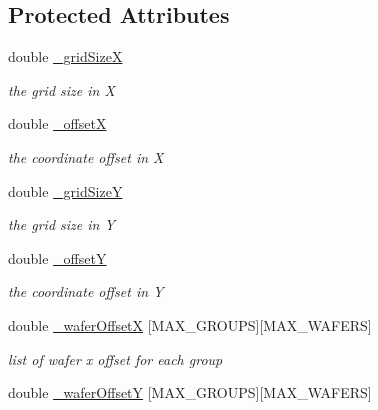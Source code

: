 \subsection*{Protected Attributes}
\begin{DoxyCompactItemize}
\item 
double \hyperlink{class_d_d4hep_1_1_d_d_segmentation_1_1_wafer_grid_x_y_af1d00f186fda3aca2aed961911bc3c04}{\_\-gridSizeX}
\begin{DoxyCompactList}\small\item\em the grid size in X \item\end{DoxyCompactList}\item 
double \hyperlink{class_d_d4hep_1_1_d_d_segmentation_1_1_wafer_grid_x_y_a4cfbedf40751f8d064a0e4c071a04d66}{\_\-offsetX}
\begin{DoxyCompactList}\small\item\em the coordinate offset in X \item\end{DoxyCompactList}\item 
double \hyperlink{class_d_d4hep_1_1_d_d_segmentation_1_1_wafer_grid_x_y_ae68069d981e55954dc25e9fbc8cc2e11}{\_\-gridSizeY}
\begin{DoxyCompactList}\small\item\em the grid size in Y \item\end{DoxyCompactList}\item 
double \hyperlink{class_d_d4hep_1_1_d_d_segmentation_1_1_wafer_grid_x_y_a560e795ea397f1a782c15d1e782f70ae}{\_\-offsetY}
\begin{DoxyCompactList}\small\item\em the coordinate offset in Y \item\end{DoxyCompactList}\item 
double \hyperlink{class_d_d4hep_1_1_d_d_segmentation_1_1_wafer_grid_x_y_ad9ff5f530eeddcdbe40f2362a96bcd84}{\_\-waferOffsetX} \mbox{[}MAX\_\-GROUPS\mbox{]}\mbox{[}MAX\_\-WAFERS\mbox{]}
\begin{DoxyCompactList}\small\item\em list of wafer x offset for each group \item\end{DoxyCompactList}\item 
double \hyperlink{class_d_d4hep_1_1_d_d_segmentation_1_1_wafer_grid_x_y_a247bd183dfa82726c4d455d4e814622f}{\_\-waferOffsetY} \mbox{[}MAX\_\-GROUPS\mbox{]}\mbox{[}MAX\_\-WAFERS\mbox{]}

\end{DoxyCompactItemize}
